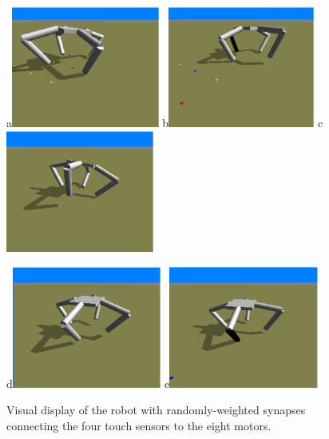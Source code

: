\documentclass[12pt]{article}
\begin{document}
\begin{figure}
\centerline{
a\includegraphics[height=4cm]{Fig1a.eps}
b\includegraphics[height=4cm]{Fig1b.eps}
c\includegraphics[height=4cm]{Fig1c.eps}}
\centerline{
d\includegraphics[height=4cm]{Fig1d.eps}
e\includegraphics[height=4cm]{Fig1e.eps}}
\caption{Visual display of the robot with randomly-weighted synapses connecting the four touch sensors to the eight motors.}
\label{Fig1}
\end{figure}
\end{document}

